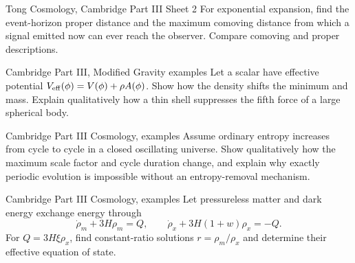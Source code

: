 \begin{exercise}{Tong Cosmology, Cambridge Part III Sheet 2}
For exponential expansion, find the event-horizon proper distance and the
maximum comoving distance from which a signal emitted now can ever reach the
observer.  Compare comoving and proper descriptions.
\end{exercise}

\begin{exercise}{Cambridge Part III, Modified Gravity examples}
Let a scalar have effective potential
\(V_{\rm eff}(\phi)=V(\phi)+\rho A(\phi)\).  Show how the density shifts the
minimum and mass.  Explain qualitatively how a thin shell suppresses the
fifth force of a large spherical body.
\end{exercise}

\begin{exercise}{Cambridge Part III Cosmology, examples}
Assume ordinary entropy increases from cycle to cycle in a closed oscillating
universe.  Show qualitatively how the maximum scale factor and cycle duration
change, and explain why exactly periodic evolution is impossible without an
entropy-removal mechanism.
\end{exercise}

\begin{exercise}{Cambridge Part III Cosmology, examples}
Let pressureless matter and dark energy exchange energy through
\[
\dot\rho_m+3H\rho_m=Q,\qquad
\dot\rho_x+3H(1+w)\rho_x=-Q.
\]
For \(Q=3H\xi\rho_x\), find constant-ratio solutions
\(r=\rho_m/\rho_x\) and determine their effective equation of state.
\end{exercise}
